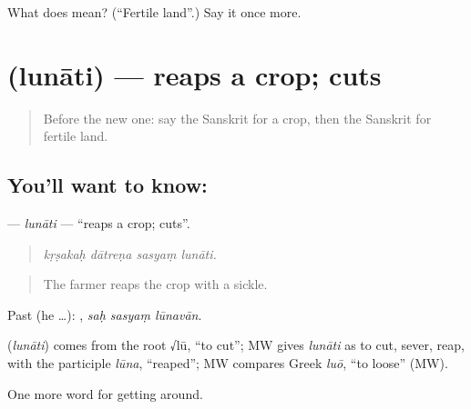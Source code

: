 \begin{tcolorbox}[breakable,colback=teal!4,colframe=teal!35!black,title={Before you move on}]
What does  mean? (\textquotedblleft{}Fertile land\textquotedblright{}.) Say it once more.
\end{tcolorbox}
\section[\texorpdfstring{\sk{लुनाति} (lunāti)}{लुनाति (lunāti)}]{ (lunāti) — reaps a crop; cuts}

\label{lesson:SA-C447-lunati}



\begin{quote}
Before the new one: say the Sanskrit for a crop, then the Sanskrit for fertile land.
\end{quote}

\subsection*{You'll want to know: }
\textbf{} — \emph{lunāti} — \textquotedblleft{}reaps a crop; cuts\textquotedblright{}.

\begin{quote}
   
\end{quote}

\begin{quote}
\emph{kṛṣakaḥ dātreṇa sasyaṃ lunāti.}
\end{quote}

\begin{quote}
The farmer reaps the crop with a sickle.
\end{quote}

Past (he …):   , \emph{saḥ sasyaṃ lūnavān}.

\begin{cousinweb}
\textbf{} (\emph{lunāti}) comes from the root √lū, \textquotedblleft{}to cut\textquotedblright{}; MW gives \emph{lunāti} as to cut, sever, reap, with the participle \emph{lūna}, \textquotedblleft{}reaped\textquotedblright{}; MW compares Greek \emph{luō}, \textquotedblleft{}to loose\textquotedblright{} (MW).
\end{cousinweb}

\begin{grammarlens}[title={What you've built}]
One more word for getting around.
\end{grammarlens}

